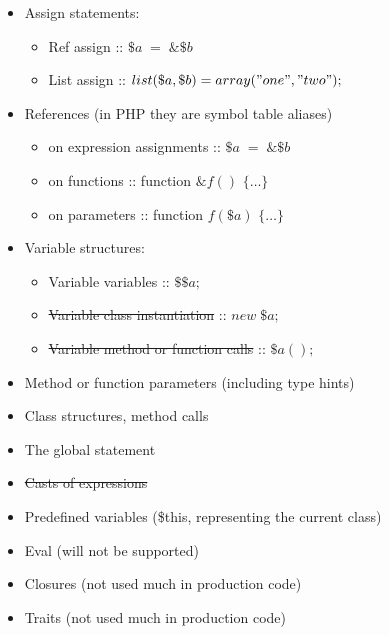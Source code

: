 \documentclass[../main.tex]{subfiles}
\begin{document}
    \begin{itemize}
        \item Assign statements:
        \begin{itemize}
            \item Ref assign :: $\$a \; = \; \&\$b$
            \item List assign :: $list(\$a, \$b) = array("one", "two");$
        \end{itemize}
        
        \item References (in PHP they are symbol table aliases)
        \begin{itemize}
            \item on expression assignments :: $\$a \; = \; \&\$b$
            \item on functions :: function $\&f()$ $\{ \dots \}$
            \item on parameters :: function $f(\$a)$ $\{ \dots \}$             
        \end{itemize}

        \item Variable structures:
        \begin{itemize}
            \item Variable variables :: $\$\$a;$
            \item \sout{Variable class instantiation} :: $new \; \$a;$
            \item \sout{Variable method or function calls} :: $\$a();$
        \end{itemize}
        
        \item Method or function parameters (including type hints)
        \item Class structures, method calls
        
        \item The global statement
        
        \item \sout{Casts of expressions}
        
        \item Predefined variables (\$this, representing the current class)

        \item Eval (will not be supported)        
        \item Closures (not used much in production code)
        \item Traits (not used much in production code)

        
        
    \end{itemize}
\end{document}
